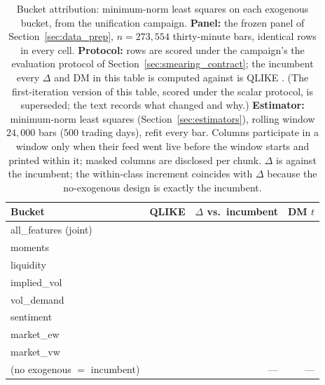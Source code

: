 \begin{table}[H]
\centering
\caption{Bucket attribution: minimum-norm least squares on each exogenous
bucket, from the unification campaign. \textbf{Panel:} the frozen panel of
Section~\ref{sec:data_prep}, $n = 273{,}554$ thirty-minute bars, identical
rows in every cell. \textbf{Protocol:} rows are scored under the campaign's
the evaluation protocol of
Section~\ref{sec:smearing_contract}; the incumbent every $\Delta$ and
DM in this table is computed against is QLIKE \unifAzeroQLIKE{}. (The
first-iteration version of this table, scored under the scalar protocol,
is superseded; the text records what changed and why.)
\textbf{Estimator:} minimum-norm least squares (Section~\ref{sec:estimators}),
rolling window $24{,}000$ bars ($500$ trading days), refit every bar. Columns
participate in a window only when their feed went live before the window
starts and printed within it; masked columns are disclosed per chunk.
$\Delta$ is against the incumbent; the within-class increment coincides
with $\Delta$ because the no-exogenous design is exactly the incumbent.}
\label{tab:buckets}
\begin{tabular}{lrrr}
\toprule
Bucket & QLIKE & $\Delta$ vs.\ incumbent & DM $t$ \\
\midrule
all\_features (joint) & \unifAllFeaturesQLIKE{} & \unifAllFeaturesDelta{} & \unifAllFeaturesDM{} \\
\midrule
moments      & \unifMomentsQLIKE{}    & \unifMomentsDelta{}    & \unifMomentsDM{} \\
liquidity    & \unifLiquidityQLIKE{}  & \unifLiquidityDelta{}  & \unifLiquidityDM{} \\
implied\_vol & \unifImpliedVolQLIKE{} & \unifImpliedVolDelta{} & \unifImpliedVolDM{} \\
vol\_demand  & \unifVolDemandQLIKE{}  & \unifVolDemandDelta{}  & \unifVolDemandDM{} \\
sentiment    & \unifSentimentQLIKE{}  & \unifSentimentDelta{}  & \unifSentimentDM{} \\
market\_ew   & \unifMarketEwQLIKE{}   & \unifMarketEwDelta{}   & \unifMarketEwDM{} \\
market\_vw   & \unifMarketVwQLIKE{}   & \unifMarketVwDelta{}   & \unifMarketVwDM{} \\
\midrule
(no exogenous $=$ incumbent) & \unifAzeroQLIKE{} & --- & --- \\
\bottomrule
\end{tabular}
\end{table}

